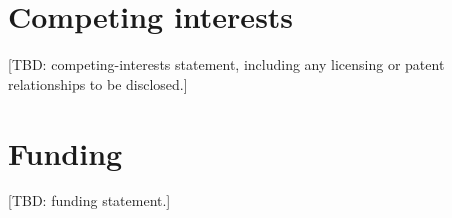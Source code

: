 \documentclass[pdflatex,sn-nature]{sn-jnl}%
\begin{document}
\section*{Competing interests}\label{sec:coi}
[TBD: competing-interests statement, including any licensing or patent relationships to be disclosed.]


\section*{Funding}\label{sec:funding}
[TBD: funding statement.]
\end{document}
